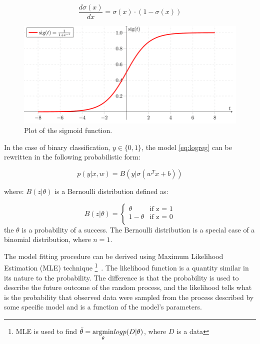 \begin{equation}
    \frac{d\sigma(x)}{dx} = \sigma(x)\cdot(1-\sigma(x))
\end{equation}


\begin{figure}[h]
\centering
\includegraphics[width=\textwidth]{figures/sigmoid.png}
\caption{Plot of the sigmoid function.
\label{fig:sigmoid}}
\end{figure}

In the case of binary classification, $y \in \{0,1\}$, the model \ref{eq:logreg} can be rewritten in the following probabilistic form:

\begin{equation}
p(y|x,w) = B(y|\sigma(w^{T}x + b))
\end{equation}

where: $B(z|\theta)$ is a Bernoulli  distribution defined as:

\begin{equation}
    B(z|\theta) =  \left\{ \begin{array}{ll}
\theta & \textrm{if z = 1}\\
1-\theta & \textrm{if z = 0}\\
\end{array} \right.
\end{equation}
the $\theta$ is a probability of a success. The Bernoulli distribution is a special case of a binomial distribution, where $n=1$. 

The model fitting procedure
can be derived using Maximum Likelihood Estimation (MLE) technique \footnote{ MLE is used to find $\Tilde{\theta} = \underset{\theta}{\mathrm{argmin}} log p(D|\theta)$, where $D$ is a data}~\cite{bishop}. The likelihood function is a quantity similar in its nature to the probability. The difference is that the probability is used to describe the future outcome of the random process, and the likelihood tells what is the probability that observed data were sampled from the process described by some specific model and is a function of the model's parameters. 

